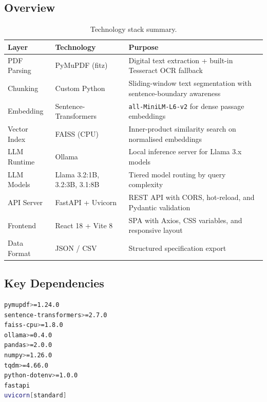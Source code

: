 \documentclass[12pt, a4paper]{article}
\begin{document}
\subsection{Overview}

\begin{table}[H]
\centering
\caption{Technology stack summary.}
\begin{tabularx}{\textwidth}{l l X}
\toprule
\textbf{Layer} & \textbf{Technology} & \textbf{Purpose} \\
\midrule
PDF Parsing     & PyMuPDF (fitz)             & Digital text extraction + built-in Tesseract OCR fallback \\
Chunking        & Custom Python              & Sliding-window text segmentation with sentence-boundary awareness \\
Embedding       & Sentence-Transformers      & \texttt{all-MiniLM-L6-v2} for dense passage embeddings \\
Vector Index    & FAISS (CPU)                & Inner-product similarity search on normalised embeddings \\
LLM Runtime     & Ollama                     & Local inference server for Llama 3.x models \\
LLM Models      & Llama 3.2:1B, 3.2:3B, 3.1:8B & Tiered model routing by query complexity \\
API Server      & FastAPI + Uvicorn          & REST API with CORS, hot-reload, and Pydantic validation \\
Frontend        & React 18 + Vite 8          & SPA with Axios, CSS variables, and responsive layout \\
Data Format     & JSON / CSV                 & Structured specification export \\
\bottomrule
\end{tabularx}
\end{table}

\subsection{Key Dependencies}

\begin{lstlisting}[language=bash, caption={requirements.txt}]
pymupdf>=1.24.0
sentence-transformers>=2.7.0
faiss-cpu>=1.8.0
ollama>=0.4.0
pandas>=2.0.0
numpy>=1.26.0
tqdm>=4.66.0
python-dotenv>=1.0.0
fastapi
uvicorn[standard]
\end{lstlisting}

\end{document}
